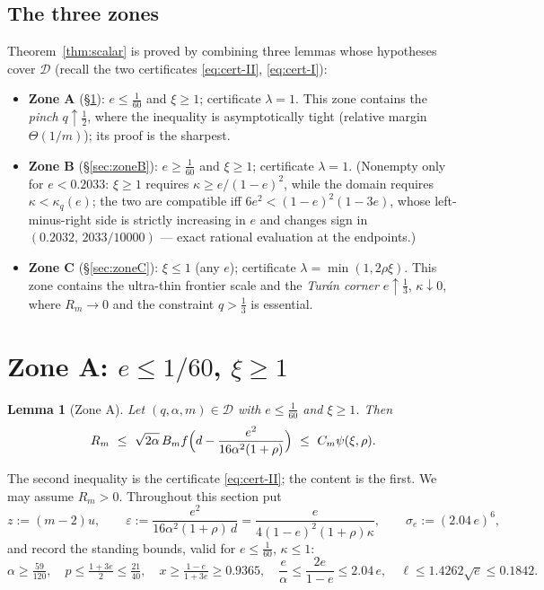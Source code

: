\documentclass[11pt]{article}
\newtheorem{lemma}[theorem]{Lemma}
\newcommand{\eps}{\varepsilon}
\begin{document}
\subsection{The three zones}

Theorem~\ref{thm:scalar} is proved by combining three lemmas whose hypotheses
cover $\mathcal D$ (recall the two certificates \eqref{eq:cert-II},
\eqref{eq:cert-I}):

\begin{itemize}[leftmargin=2em]
\item \textbf{Zone A} (\S\ref{sec:zoneA}): $e\le\tfrac1{60}$ and $\xi\ge1$;
certificate $\lambda=1$.  This zone contains the \emph{pinch}
$q\uparrow\tfrac12$, where the inequality is asymptotically tight (relative
margin $\Theta(1/m)$); its proof is the sharpest.
\item \textbf{Zone B} (\S\ref{sec:zoneB}): $e\ge\tfrac1{60}$ and $\xi\ge1$;
certificate $\lambda=1$.  (Nonempty only for $e<0.2033$: $\xi\ge1$ requires
$\kappa\ge e/(1-e)^2$, while the domain requires $\kappa<\kappa_q(e)$; the two
are compatible iff $6e^2<(1-e)^2(1-3e)$, whose left-minus-right side is
strictly increasing in $e$ and changes sign in $(0.2032,\,2033/10000)$ ---
exact rational evaluation at the endpoints.)
\item \textbf{Zone C} (\S\ref{sec:zoneC}): $\xi\le1$ (any $e$); certificate
$\lambda=\min(1,2\rho\xi)$.  This zone contains the ultra-thin frontier scale
and the \emph{Tur\'an corner} $e\uparrow\tfrac13$, $\kappa\downarrow0$, where
$R_m\to0$ and the constraint $q>\tfrac13$ is essential.
\end{itemize}

\section{Zone A: $e\le1/60$, $\xi\ge1$}\label{sec:zoneA}

\begin{lemma}[Zone A]\label{lem:zoneA}
Let $(q,\alpha,m)\in\mathcal D$ with $e\le\tfrac1{60}$ and $\xi\ge1$.  Then
\begin{equation}\label{eq:zoneA-target}
        R_m\ \le\
        \sqrt{2\alpha}\,B_m f\Bigl(d-\frac{e^2}{16\alpha^2(1+\rho)}\Bigr)
        \ \le\ C_m\psi(\xi,\rho).
\end{equation}
\end{lemma}

The second inequality is the certificate \eqref{eq:cert-II}; the content is the
first.  We may assume $R_m>0$.  Throughout this section put
\[
        z:=(m-2)u,
        \qquad
        \eps:=\frac{e^2}{16\alpha^2(1+\rho)\,d}
        =\frac{e}{4(1-e)^2(1+\rho)\kappa},
        \qquad
        \sigma_e:=(2.04\,e)^{6},
\]
and record the standing bounds, valid for $e\le\tfrac1{60}$, $\kappa\le1$:
\begin{equation}\label{eq:standing}
        \alpha\ge\tfrac{59}{120},\quad
        p\le\tfrac{1+3e}2\le\tfrac{21}{40},\quad
        x\ge\tfrac{1-e}{1+3e}\ge0.9365,\quad
        \frac e\alpha\le\frac{2e}{1-e}\le2.04\,e,\quad
        \ell\le1.4262\sqrt e\le0.1842 .
\end{equation}
\end{document}
